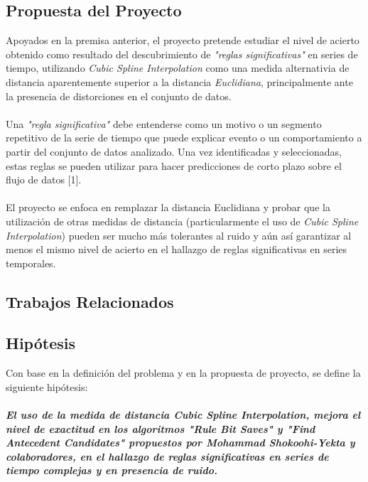 \subsection{Propuesta del Proyecto}
Apoyados en la premisa anterior, el proyecto pretende estudiar el nivel de acierto obtenido como resultado del descubrimiento de \textit{"reglas significativas"} en series de tiempo, utilizando \textit{Cubic Spline Interpolation} como una medida alternativia de distancia aparentemente superior a la distancia \textit{Euclidiana}, principalmente ante la presencia de distorciones en el conjunto de datos.\\\\
Una \textit{"regla significativa"} debe entenderse como un motivo o un segmento repetitivo de la serie de tiempo que puede explicar evento o un comportamiento a partir del conjunto de datos analizado. Una vez identificadas y seleccionadas, estas reglas se pueden utilizar para hacer predicciones de corto plazo sobre el flujo de datos [1].\\\\
El proyecto se enfoca en remplazar la distancia Euclidiana y probar que la utilizaci\'on de otras medidas de distancia (particularmente el uso de \textit{Cubic Spline Interpolation}) pueden ser mucho m\'as tolerantes al ruido y a\'un as\'i garantizar al menos el mismo nivel de acierto en el hallazgo de reglas significativas en series temporales.
\subsection{Trabajos Relacionados}
\subsection{Hip\'otesis}
Con base en la definici\'on del problema y en la propuesta de proyecto, se define la siguiente hip\'otesis:\\\\
\textbf{\textit{El uso de la medida de distancia \textit{Cubic Spline Interpolation}, mejora el nivel de exactitud en los algoritmos \textit{\textbf{"Rule Bit Saves"}} y \textit{\textbf{"Find Antecedent Candidates"}} propuestos por Mohammad Shokoohi-Yekta y colaboradores, en el hallazgo de reglas significativas en series de tiempo complejas y en presencia de ruido.}} 
